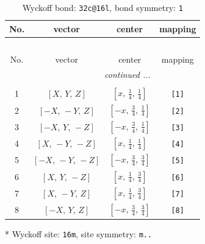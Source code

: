 \documentclass[fleqn,8pt]{jsarticle}
\begin{document}
\renewcommand{\arraystretch}{1.2}
\begin{longtable}{cccc}
\caption{Wyckoff bond: {\tt 32c@16l}, bond symmetry: {\tt 1}}
 \\
 \hline \hline
No. & vector & center & mapping \\ \hline \endfirsthead

\multicolumn{3}{l}{\tablename\ \thetable{}} \\
 \hline \hline
No. & vector & center & mapping \\ \hline \endhead

 \hline \hline
\multicolumn{3}{r}{\footnotesize\it continued ...} \\ \endfoot

 \hline \hline
\multicolumn{3}{r}{} \\ \endlastfoot

1 & $\left[ X,\, Y,\, Z \right]$ & $\left[ x,\, \frac{1}{4},\, \frac{1}{4} \right]$ & {\tt [1]} \\ \hline
2 & $\left[ - X,\, - Y,\, Z \right]$ & $\left[ - x,\, \frac{3}{4},\, \frac{1}{4} \right]$ & {\tt [2]} \\ \hline
3 & $\left[ - X,\, Y,\, - Z \right]$ & $\left[ - x,\, \frac{3}{4},\, \frac{1}{4} \right]$ & {\tt [3]} \\ \hline
4 & $\left[ X,\, - Y,\, - Z \right]$ & $\left[ x,\, \frac{1}{4},\, \frac{1}{4} \right]$ & {\tt [4]} \\ \hline
5 & $\left[ - X,\, - Y,\, - Z \right]$ & $\left[ - x,\, \frac{3}{4},\, \frac{3}{4} \right]$ & {\tt [5]} \\ \hline
6 & $\left[ X,\, Y,\, - Z \right]$ & $\left[ x,\, \frac{1}{4},\, \frac{3}{4} \right]$ & {\tt [6]} \\ \hline
7 & $\left[ X,\, - Y,\, Z \right]$ & $\left[ x,\, \frac{1}{4},\, \frac{3}{4} \right]$ & {\tt [7]} \\ \hline
8 & $\left[ - X,\, Y,\, Z \right]$ & $\left[ - x,\, \frac{3}{4},\, \frac{3}{4} \right]$ & {\tt [8]} \\
\end{longtable}
* Wyckoff site: {\tt 16m}, site symmetry: {\tt m..}
\renewcommand{\arraystretch}{1.2}
\end{document}
